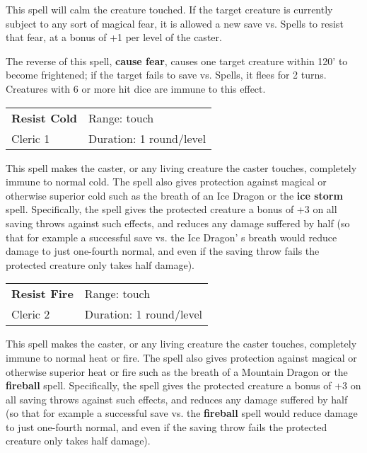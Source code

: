 \documentclass[a4paper,twoside,openany,10pt]{book}
\begin{document}
\begin{multicols}{2}
This spell will calm the creature touched. If the target creature is currently subject to any sort of magical fear, it is allowed a new save vs. Spells to resist that fear, at a bonus of +1 per level of the caster.

The reverse of this spell, \textbf{cause fear}, causes one target creature within 120' to become frightened; if the target fails to save vs. Spells, it flees for 2 turns. Creatures with 6 or more hit dice are immune to this effect.

\smallskip\begin{flushleft} 
	\begin{tabularx}{0.45\textwidth}{@{}m{3.5cm}m{5.5cm}@{}} 
		\textbf{Resist Cold} & Range: touch\\
		Cleric 1 & Duration: 1 round/level\\
	\end{tabularx}\end{flushleft}

This spell makes the caster, or any living creature the caster touches, completely immune to normal cold. The spell also gives protection against magical or otherwise superior cold such as the breath of an Ice Dragon or the \textbf{ice storm} spell. Specifically, the spell gives the protected creature a bonus of +3 on all saving throws against such effects, and reduces any damage suffered by half (so that for example a successful save vs. the Ice Dragon' s breath would reduce damage to just one-fourth normal, and even if the saving throw fails the protected creature only takes half damage).


\smallskip\begin{flushleft} 
	\begin{tabularx}{0.45\textwidth}{@{}m{3.5cm}m{5.5cm}@{}} 
		\textbf{Resist Fire} & Range: touch\\
		Cleric 2 & Duration: 1 round/level\\
	\end{tabularx}\end{flushleft}

This spell makes the caster, or any living creature the caster touches, completely immune to normal heat or fire. The spell also gives protection against magical or otherwise superior heat or fire such as the breath of a Mountain Dragon or the \textbf{fireball} spell. Specifically, the spell gives the protected creature a bonus of +3 on all saving throws against such effects, and reduces any damage suffered by half (so that for example a successful save vs. the \textbf{fireball }spell would reduce damage to just one-fourth normal, and even if the saving throw fails the protected creature only takes half damage).


\end{multicols}
\end{document}
